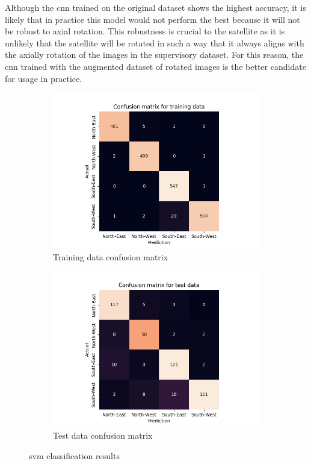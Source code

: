 \documentclass[10pt,twocolumn,letterpaper]{article}
\begin{document}
Although the \acrshort{cnn} trained on the original dataset shows the highest accuracy, it is likely that in practice this model would not perform the best because it will not be robust to axial rotation. This robustness is crucial to the satellite as it is unlikely that the satellite will be rotated in such a way that it always aligns with the axially rotation of the images in the supervisory dataset. For this reason, the \acrshort{cnn} trained with the augmented dataset of rotated images is the better candidate for usage in practice.

\begin{figure}
  \centering
  \begin{subfigure}{.33\linewidth}
    \includegraphics[width=\linewidth, trim={7em, 0em, 9em, 5em}, clip]{svm_cfsn_train}
    \caption{Training data confusion matrix}
    \label{fig:svm_train}
  \end{subfigure}
  \begin{subfigure}{0.33\linewidth}
    \includegraphics[width=\linewidth, trim={7em, 0em, 9em, 5em}, clip]{svm_cfsn_test}
    \caption{Test data confusion matrix}
    \label{fig:svm_test}
  \end{subfigure}
  \caption{\acrlong{svm} classification results}
  \label{fig:svm_res}
\end{figure}
\end{document}
